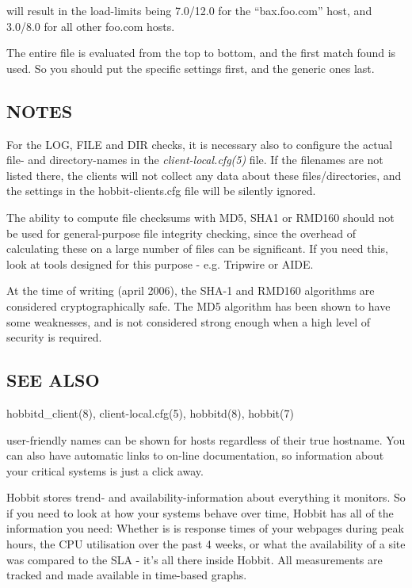   will result in the load-limits being 7.0/12.0 for the
  ``bax.foo.com'' host, and 3.0/8.0 for all other foo.com hosts. 

  The entire file is evaluated from the top to bottom, and the first
  match found is used. So you should put the specific settings first,
  and the generic ones last. 
 
\subsection{NOTES}
 For the LOG, FILE and DIR checks, it is necessary also to configure
 the actual file- and directory-names in the
 \emph{client-local.cfg(5)} file. If the filenames are not listed
 there, the clients will not collect any data about these
 files/directories, and the settings in the hobbit-clients.cfg file
 will be silently ignored. 


  The ability to compute file checksums with MD5, SHA1 or RMD160
  should not be used for general-purpose file integrity checking,
  since the overhead of calculating these on a large number of files
  can be significant. If you need this, look at tools designed for
  this purpose - e.g. Tripwire or AIDE. 



  At the time of writing (april 2006), the SHA-1 and RMD160 algorithms
  are considered cryptographically safe. The MD5 algorithm has been
  shown to have some weaknesses, and is not considered strong enough
  when a high level of security is required. 



\subsection{SEE ALSO}
hobbitd\_client(8), client-local.cfg(5), hobbitd(8), hobbit(7) 

 
  user-friendly names can be shown for hosts regardless of their true
  hostname. You can also have automatic links to on-line
  documentation, so information about your critical systems is just a
  click away. 

\item[Integrated trend analysis, historical data and SLA reporting]
  Hobbit stores trend- and availability-information about everything
  it monitors. So if you need to look at how your systems behave over
  time, Hobbit has all of the information you need: Whether is is
  response times of your webpages during peak hours, the CPU
  utilisation over the past 4 weeks, or what the availability of a
  site was compared to the SLA - it's all there inside Hobbit. All
  measurements are tracked and made available in time-based graphs. 


